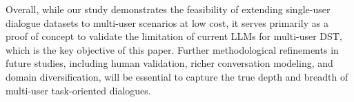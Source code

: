\documentclass[11pt]{article}
\begin{document}
Overall, while our study demonstrates the feasibility of extending single-user dialogue datasets to multi-user scenarios at low cost, it serves primarily as a proof of concept to validate the limitation of current LLMs for multi-user DST, which is the key objective of this paper. Further methodological refinements in future studies, including human validation, richer conversation modeling, and domain diversification, will be essential to capture the true depth and breadth of multi-user task-oriented dialogues.








\end{document}
